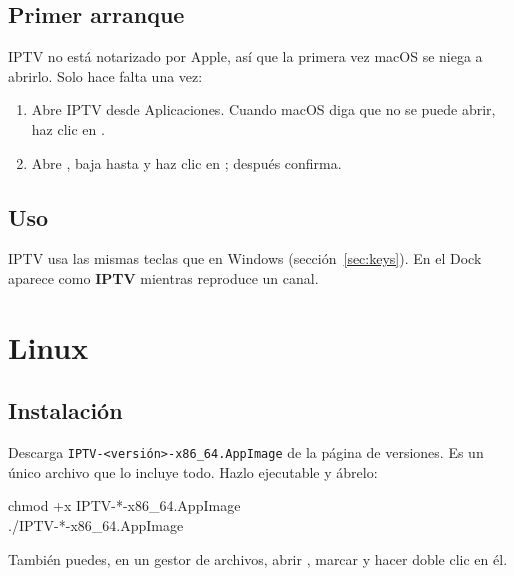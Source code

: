 \subsection{Primer arranque}
IPTV no está notarizado por Apple, así que la primera vez macOS se niega a
abrirlo. Solo hace falta una vez:
\begin{enumerate}
  \item Abre IPTV desde Aplicaciones. Cuando macOS diga que no se puede abrir,
        haz clic en .
  \item Abre , baja hasta  y haz clic
        en ; después confirma.
\end{enumerate}

\subsection{Uso}
IPTV usa las mismas teclas que en Windows (sección~\ref{sec:keys}). En el
Dock aparece como \textbf{IPTV} mientras reproduce un canal.


\section{Linux}

\subsection{Instalación}
Descarga \texttt{IPTV-\textless versión\textgreater-x86\_64.AppImage} de la
página de versiones. Es un único archivo que lo incluye todo. Hazlo
ejecutable y ábrelo:
\begin{center}
\begin{minipage}{0.8\linewidth}
\small\ttfamily chmod +x IPTV-*-x86\_64.AppImage\\
./IPTV-*-x86\_64.AppImage
\end{minipage}
\end{center}
También puedes, en un gestor de archivos, abrir , marcar  y hacer doble clic en él.

